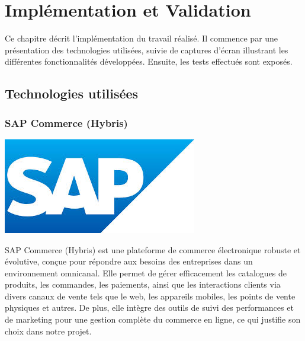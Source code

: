 \chapter{Implémentation et Validation}
\label{chap:Implémentation et Validation}


Ce chapitre décrit l'implémentation du travail réalisé. Il commence par une présentation des technologies utilisées, suivie de captures d'écran illustrant les différentes fonctionnalités développées. Ensuite, les tests effectués sont exposés.
\newpage
\section{Technologies utilisées}
\subsection*{SAP Commerce (Hybris)}
\begin{center}
    \centering
    \includegraphics[scale=0.5]{Figures/SAP.jpg}
    \label{fig:processus}
\end{center} 

SAP Commerce (Hybris) est une plateforme de commerce électronique robuste et évolutive, conçue pour répondre aux besoins des entreprises dans un environnement omnicanal. Elle permet de gérer efficacement les catalogues de produits, les commandes, les paiements, ainsi que les interactions clients via divers canaux de vente tels que le web, les appareils mobiles, les points de vente physiques et autres. De plus, elle intègre des outils de suivi des performances et de marketing pour une gestion complète du commerce en ligne, ce qui justifie son choix dans notre projet.

